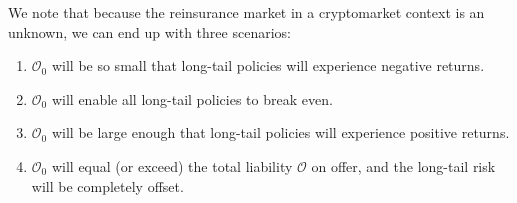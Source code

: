 \documentclass[12pt]{article}
\begin{document}
We note that because the reinsurance market in a cryptomarket context is an unknown, we can end up with three scenarios:

\begin{enumerate}
  \item $\mathcal O_0$ will be so small that long-tail policies will experience negative returns.
  \item $\mathcal O_0$ will enable all long-tail policies to break even.
  \item $\mathcal O_0$ will be large enough that long-tail policies will experience positive returns.
  \item $\mathcal O_0$ will equal (or exceed) the total liability $\mathcal O$ on offer, and the long-tail risk will be completely offset.
\end{enumerate}
\fi
\end{document}
